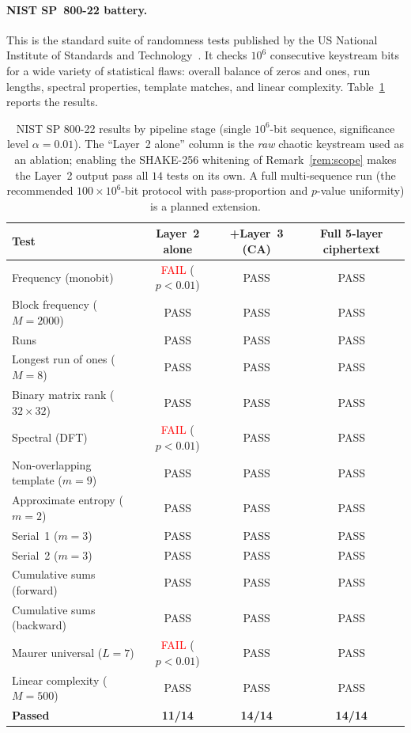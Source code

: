 \documentclass[pdflatex,sn-mathphys-num]{sn-jnl}%
\theoremstyle{thmstyleone}%
\theoremstyle{thmstyletwo}%
\theoremstyle{thmstylethree}%
\begin{document}
\paragraph{NIST SP~800-22 battery.} This is the standard suite of randomness tests published by the US National Institute of Standards and Technology~\cite{rukhin2010}. It checks $10^6$ consecutive keystream bits for a wide variety of statistical flaws: overall balance of zeros and ones, run lengths, spectral properties, template matches, and linear complexity. Table~\ref{tab:nist} reports the results.

\begin{table}[t]
\centering
\caption{NIST SP 800-22 results by pipeline stage (single $10^6$-bit sequence,
significance level $\alpha=0.01$). The ``Layer~2 alone'' column is the \emph{raw} chaotic keystream used as an ablation; enabling the SHAKE-256 whitening of Remark~\ref{rem:scope} makes the Layer~2 output pass all $14$ tests on its own. A full multi-sequence run (the recommended $100\times10^6$-bit protocol with pass-proportion and $p$-value uniformity) is a planned extension.}
\label{tab:nist}
\begin{tabular}{@{}lccc@{}}
\toprule
Test & Layer~2 alone & +Layer~3 (CA) & Full 5-layer ciphertext \\
\midrule
Frequency (monobit) & \textcolor{red}{FAIL} ($p<0.01$) & PASS & PASS \\
Block frequency ($M=2000$) & PASS & PASS & PASS \\
Runs & PASS & PASS & PASS \\
Longest run of ones ($M=8$) & PASS & PASS & PASS \\
Binary matrix rank ($32\times32$) & PASS & PASS & PASS \\
Spectral (DFT) & \textcolor{red}{FAIL} ($p<0.01$) & PASS & PASS \\
Non-overlapping template ($m=9$) & PASS & PASS & PASS \\
Approximate entropy ($m=2$) & PASS & PASS & PASS \\
Serial~1 ($m=3$) & PASS & PASS & PASS \\
Serial~2 ($m=3$) & PASS & PASS & PASS \\
Cumulative sums (forward) & PASS & PASS & PASS \\
Cumulative sums (backward) & PASS & PASS & PASS \\
Maurer universal ($L=7$) & \textcolor{red}{FAIL} ($p<0.01$) & PASS & PASS \\
Linear complexity ($M=500$) & PASS & PASS & PASS \\
\midrule
\textbf{Passed} & \textbf{11/14} & \textbf{14/14} & \textbf{14/14} \\
\bottomrule
\end{tabular}
\end{table}
\end{document}
